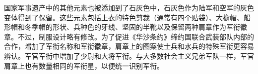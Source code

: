 国家军事遗产中的其他元素也被添加到了石灰色中，石灰色作为陆军和空军的灰色变体得到了保留。这些元素包括上衣的特色剪裁（通常有四个贴袋）、大檐帽、船形帽和冬季帽的形状、兵种色的牙线、坚固的半靴以及保留两种肩章作为军衔徽章。不过，制服设计略有修改。为了促进《华沙条约》缔约国联合武装部队内部的合作，增加了军衔名称和军衔徽章，肩章上的图案使士兵和水兵的特殊军衔更容易辨认。军官军衔中增加了少尉和大将军衔。与大多数社会主义兄弟军队一样，军官肩章上也有数量相同的军衔星，以便统一识别军衔。

